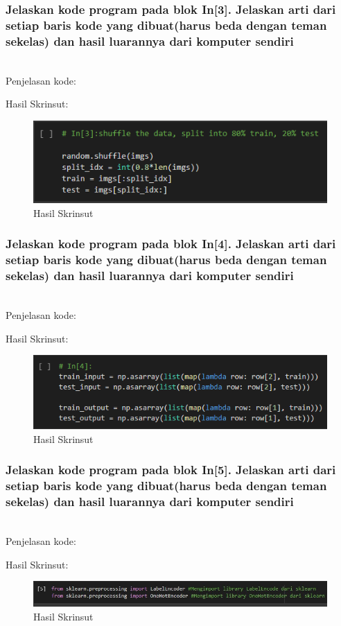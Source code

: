 \subsubsection{Jelaskan kode program pada blok  In[3]. Jelaskan arti dari setiap baris kode yang dibuat(harus beda dengan teman sekelas) dan hasil luarannya dari komputer sendiri}
\hfill\\
Penjelasan kode:

Hasil Skrinsut:
\begin{figure}[H]
	\centering
	\includegraphics[scale=0.5]{figures/1174083/figures7/p3.png}
	\caption{Hasil Skrinsut}
\end{figure}



\subsubsection{Jelaskan kode program pada blok  In[4]. Jelaskan arti dari setiap baris kode yang dibuat(harus beda dengan teman sekelas) dan hasil luarannya dari komputer sendiri}
\hfill\\
Penjelasan kode:

Hasil Skrinsut:
\begin{figure}[H]
	\centering
	\includegraphics[scale=0.5]{figures/1174083/figures7/p4.png}
	\caption{Hasil Skrinsut}
\end{figure}
	

\subsubsection{Jelaskan kode program pada blok  In[5]. Jelaskan arti dari setiap baris kode yang dibuat(harus beda dengan teman sekelas) dan hasil luarannya dari komputer sendiri}
\hfill\\
Penjelasan kode:

Hasil Skrinsut:
\begin{figure}[H]
	\centering
	\includegraphics[scale=0.5]{figures/1174083/figures7/p5.png}
	\caption{Hasil Skrinsut}
\end{figure}


